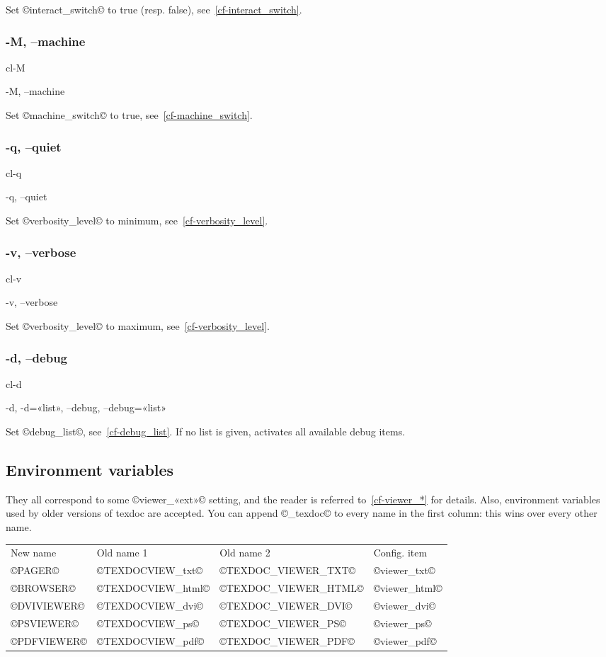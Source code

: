 \documentclass[a4paper, oneside]{scrartcl}
\newif\ifframed
\newenvironment{cmdsubsub}[2]{%
  \framedfalse \commandes\subsubsection{#1}{#2}%
  }{%
  \endcommandes}
\begin{document}
Set ©interact_switch© to true (resp. false), see~\ref{cf-interact_switch}.

\begin{cmdsubsub}{-M, --machine}{cl-M}
  -M, --machine
\end{cmdsubsub}

Set ©machine_switch© to true, see~\ref{cf-machine_switch}.

\begin{cmdsubsub}{-q, --quiet}{cl-q}
  -q, --quiet
\end{cmdsubsub}

Set ©verbosity_level© to minimum, see~\ref{cf-verbosity_level}.

\begin{cmdsubsub}{-v, --verbose}{cl-v}
  -v, --verbose
\end{cmdsubsub}

Set ©verbosity_level© to maximum, see~\ref{cf-verbosity_level}.

\begin{cmdsubsub}{-d, --debug}{cl-d}
  -d, -d=«list», --debug, --debug=«list»
\end{cmdsubsub}

Set ©debug_list©, see~\ref{cf-debug_list}. If no list is given, activates all
available debug items.

\subsection{Environment variables}\label{ss-envvar}

They all correspond to some ©viewer_«ext»© setting, and the reader is referred
to~\ref{cf-viewer_*} for details. Also, environment variables used by older
versions of texdoc are accepted. You can append ©_texdoc© to every name in
the first column: this wins over every other name.

\begin{center}
  \begin{tabular}{*4l}
    New name    & Old name 1        & Old name 2           & Config. item  \\
    ©PAGER©     & ©TEXDOCVIEW_txt©  & ©TEXDOC_VIEWER_TXT©  & ©viewer_txt©  \\
    ©BROWSER©   & ©TEXDOCVIEW_html© & ©TEXDOC_VIEWER_HTML© & ©viewer_html© \\
    ©DVIVIEWER© & ©TEXDOCVIEW_dvi©  & ©TEXDOC_VIEWER_DVI©  & ©viewer_dvi©  \\
    ©PSVIEWER©  & ©TEXDOCVIEW_ps©   & ©TEXDOC_VIEWER_PS©   & ©viewer_ps©   \\
    ©PDFVIEWER© & ©TEXDOCVIEW_pdf©  & ©TEXDOC_VIEWER_PDF©  & ©viewer_pdf©  \\
  \end{tabular}
\end{center}
\end{document}
